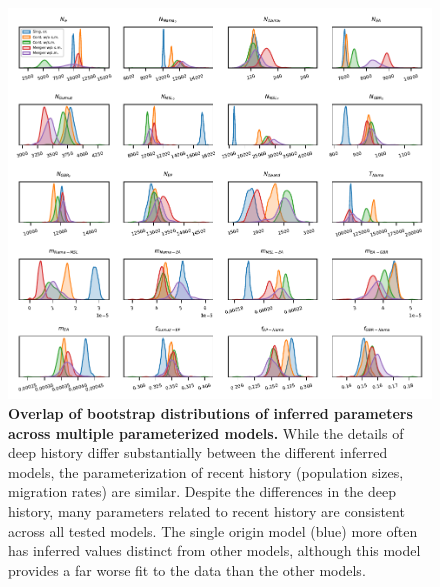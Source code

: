 \documentclass[]{article}
\begin{document}
\begin{figure}[ht]
    \centering
    \includegraphics{figures/supp-bootstrap-fits-overlap.pdf}
    \caption{
        \textbf{Overlap of bootstrap distributions of inferred parameters
        across multiple parameterized models.} While the details of deep
        history differ substantially between the different inferred models, the
        parameterization of recent history (population sizes, migration rates)
        are similar. Despite the differences in the deep history, many
        parameters related to recent history are consistent across all tested
        models. The single origin model (blue) more often has inferred values
        distinct from other models, although this model provides a far worse
        fit to the data than the other models.
    }
    \label{fig:supp-bootstrap-overlap}
\end{figure}
\end{document}
